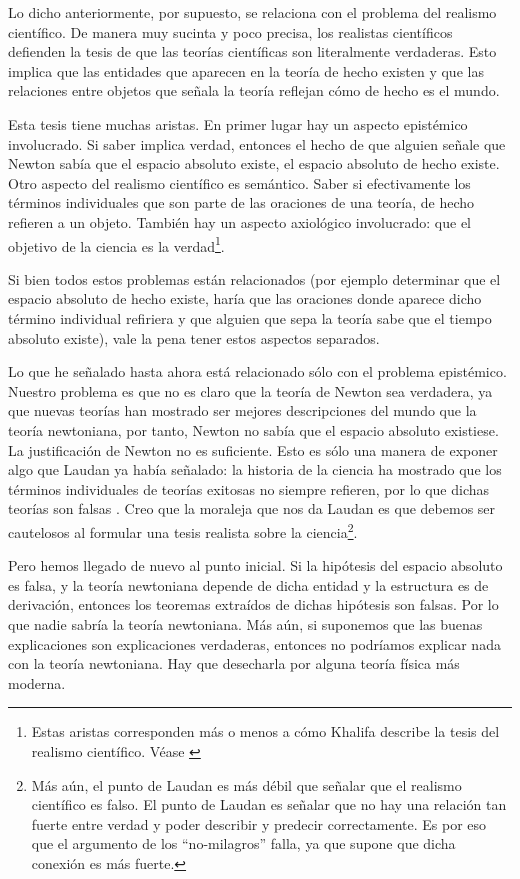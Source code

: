 \documentclass{article}
\begin{document}
Lo dicho anteriormente, por supuesto, se relaciona con el problema del realismo científico. De manera muy sucinta y poco precisa, los realistas científicos defienden la tesis de que las teorías científicas son literalmente verdaderas. Esto implica que las entidades que aparecen en la teoría de hecho existen y que las relaciones entre objetos que señala la teoría reflejan cómo de hecho es el mundo.

Esta tesis tiene muchas aristas. En primer lugar hay un aspecto epistémico involucrado. Si saber implica verdad, entonces el hecho de que alguien señale que Newton sabía que el espacio absoluto existe, el espacio absoluto de hecho existe. Otro aspecto del realismo científico es semántico. Saber si efectivamente los términos individuales que son parte de las oraciones de una teoría, de hecho refieren a un objeto. También hay un aspecto axiológico involucrado: que el objetivo de la ciencia es la verdad\footnote{Estas aristas corresponden más o menos a cómo Khalifa describe la tesis del realismo científico. Véase \citeyear{Khalifa2010-KHASCA}}.

Si bien todos estos problemas están relacionados (por ejemplo determinar que el espacio absoluto de hecho existe, haría que las oraciones donde aparece dicho término individual refiriera y que alguien que sepa la teoría sabe que el tiempo absoluto existe), vale la pena tener estos aspectos separados. 

Lo que he señalado hasta ahora está relacionado sólo con el problema epistémico. Nuestro problema es que no es claro que la teoría de Newton sea verdadera, ya que nuevas teorías han mostrado ser mejores descripciones del mundo que la teoría newtoniana, por tanto, Newton no sabía que el espacio absoluto existiese. La justificación de Newton no es suficiente. Esto es sólo una manera de exponer algo que Laudan ya había señalado: la historia de la ciencia ha mostrado que los términos individuales de teorías exitosas no siempre refieren, por lo que dichas teorías son falsas \cite{Laudan1981}. Creo que la moraleja que nos da Laudan es que debemos ser cautelosos al formular una tesis realista sobre la ciencia\footnote{Más aún, el punto de Laudan es más débil que señalar que el realismo científico es falso. El punto de Laudan es señalar que no hay una relación tan fuerte entre verdad y poder describir y predecir correctamente. Es por eso que el argumento de los ``no-milagros'' falla, ya que supone que dicha conexión es más fuerte.}.

Pero hemos llegado de nuevo al punto inicial. Si la hipótesis del espacio absoluto es falsa, y la teoría newtoniana depende de dicha entidad y la estructura es de derivación, entonces los teoremas extraídos de dichas hipótesis son falsas. Por lo que nadie sabría la teoría newtoniana. Más aún, si suponemos que las buenas explicaciones son explicaciones verdaderas, entonces no podríamos explicar nada con la teoría newtoniana. Hay que desecharla por alguna teoría física más moderna.
\end{document}
